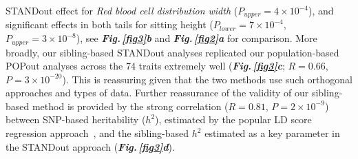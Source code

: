 \documentclass[12pt]{zHenriquesLab-StyleBioRxiv}
\newcommand\dref[2]{\normalsize{\textbf{\textit{Fig.\,\ref{#1}#2}}}\normalsize{}}
\begin{document}
STANDout effect for \emph{Red blood cell distribution width} ($P_{upper}=4 \times 10^{-4}$), 
and significant effects in both tails for sitting height 
($P_{lower}=7 \times 10^{-4}$, $P_{upper}=3 \times 10^{-8}$), see 
\dref{fig3}{b} and \dref{fig2}{a} for comparison. 
More broadly, our sibling-based STANDout analyses replicated our 
population-based POPout analyses across the 74 traits extremely 
well (\dref{fig3}{c}; $R = 0.66$, $P = 3 \times 10^{-20}$). 
This is reassuring given that the two methods use such
orthogonal approaches and types of data. Further reassurance 
of the validity of our sibling-based method is provided by 
the strong correlation ($R = 0.81$, $P = 2 \times 10^{-9}$) 
between SNP-based heritability ($h^2$), estimated by the 
popular LD score regression approach~\cite{BulikSullivan2015}, 
and the sibling-based $h^2$ estimated as a key parameter in 
the STANDout approach (\dref{fig3}{d}). 
%
\end{document}
